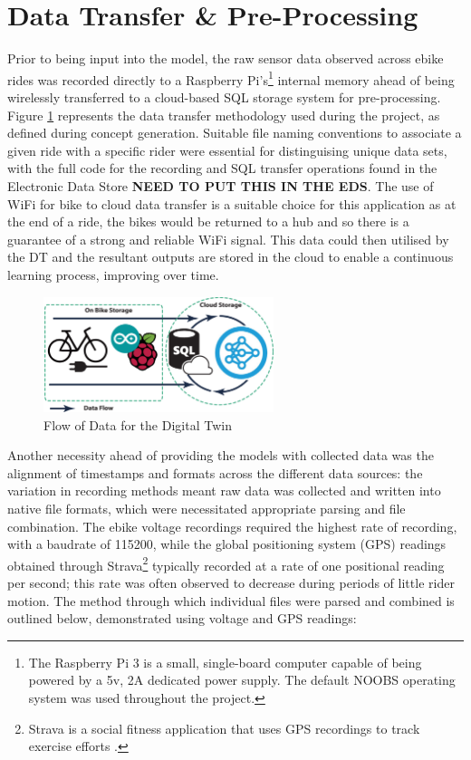 \documentclass[a4paper, 10pt]{article}
\numberwithin{equation}{section}
\begin{document}

\newpage

\section{Data Transfer \& Pre-Processing}
\label{sec:preprocessing}

Prior to being input into the model, the raw sensor data observed across ebike rides was recorded directly to a Raspberry Pi's\footnote{The Raspberry Pi 3 is a small, single-board computer capable of being powered by a 5v, 2A dedicated power supply. The default NOOBS operating system was used throughout the project.} internal memory ahead of being wirelessly transferred to a cloud-based SQL storage system for pre-processing. Figure \ref{fig:dataflow} represents the data transfer methodology used during the project, as defined during concept generation. Suitable file naming conventions to associate a given ride with a specific rider were essential for distinguising unique data sets, with the full code for the recording and SQL transfer operations found in the Electronic Data Store \textbf{NEED TO PUT THIS IN THE EDS}. The use of WiFi for bike to cloud data transfer is a suitable choice for this application as at the end of a ride, the bikes would be returned to a hub and so there is a guarantee of a strong and reliable WiFi signal. This data could then utilised by the DT and the resultant outputs are stored in the cloud to enable a continuous learning process, improving over time. 

\begin{figure}[h!]
    \centering
    \includegraphics[width=0.6\textwidth]{images/Data_Flow.eps}
    \caption{Flow of Data for the Digital Twin}
    \label{fig:dataflow}
\end{figure}

Another necessity ahead of providing the models with collected data was the alignment of timestamps and formats across the different data sources: the variation in recording methods meant raw data was collected and written into native file formats, which were necessitated appropriate parsing and file combination. The ebike voltage recordings required the highest rate of recording, with a baudrate of 115200, while the global positioning system (GPS) readings obtained through Strava\footnote{Strava is a social fitness application that uses GPS recordings to track exercise efforts \cite{web:Strava}.} typically recorded at a rate of one positional reading per second; this rate was often observed to decrease during periods of little rider motion. The method through which individual files were parsed and combined is outlined below, demonstrated using voltage and GPS readings:
\end{document}
